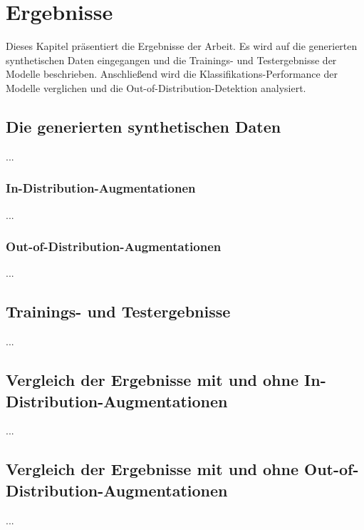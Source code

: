 \chapter{Ergebnisse}

Dieses Kapitel präsentiert die Ergebnisse der Arbeit. Es wird auf die generierten synthetischen Daten eingegangen und die Trainings- und Testergebnisse der Modelle beschrieben. Anschließend wird die Klassifikations-Performance der Modelle verglichen und die Out-of-Distribution-Detektion analysiert.

\section{Die generierten synthetischen Daten}


...

\subsection{In-Distribution-Augmentationen}


...

\subsection{Out-of-Distribution-Augmentationen}


...

\section{Trainings- und Testergebnisse}


...

\section{Vergleich der Ergebnisse mit und ohne In-Distribution-Augmentationen}

...

\section{Vergleich der Ergebnisse mit und ohne Out-of-Distribution-Augmentationen}

...
%
%
